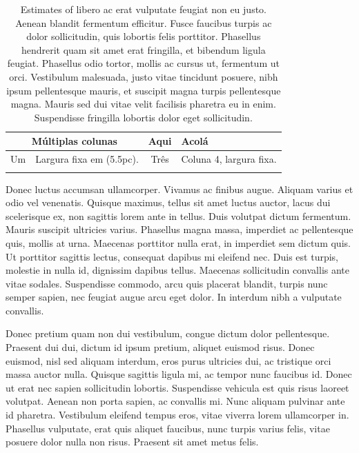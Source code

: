 \begin{btUnit}
\begin{table}
\centering
\caption{Estimates of libero ac erat vulputate feugiat non
  eu justo. Aenean blandit fermentum efficitur. Fusce faucibus turpis
  ac dolor sollicitudin, quis lobortis felis porttitor. Phasellus
  hendrerit quam sit amet erat fringilla, et bibendum ligula feugiat.
  Phasellus odio tortor, mollis ac cursus ut, fermentum ut orci.
  Vestibulum malesuada, justo vitae tincidunt posuere, nibh ipsum
  pellentesque mauris, et suscipit magna turpis pellentesque magna.
  Mauris sed dui vitae velit facilisis pharetra eu in enim.
  Suspendisse fringilla lobortis dolor eget sollicitudin.}
\begin{tabular}{ c p{5.5pc} c p{5.5pc} }
\hline
\multicolumn{2}{c}{Múltiplas colunas} & Aqui & Acolá \\
\hline
Um & \raggedright\arraybackslash Largura fixa em (5.5pc). & Três &
\raggedright\arraybackslash Coluna 4, largura fixa.\\
\hline
\label{Tab:estim2}
\end{tabular}
\end{table}

Donec luctus accumsan ullamcorper. Vivamus ac finibus augue. Aliquam
varius et odio vel venenatis. Quisque maximus, tellus sit amet luctus
auctor, lacus dui scelerisque ex, non sagittis lorem ante in tellus.
Duis volutpat dictum fermentum. Mauris suscipit ultricies varius.
Phasellus magna massa, imperdiet ac pellentesque quis, mollis at urna.
Maecenas porttitor nulla erat, in imperdiet sem dictum quis. Ut
porttitor sagittis lectus, consequat dapibus mi eleifend nec. Duis est
turpis, molestie in nulla id, dignissim dapibus tellus. Maecenas
sollicitudin convallis ante vitae sodales. Suspendisse commodo, arcu
quis placerat blandit, turpis nunc semper sapien, nec feugiat augue
arcu eget dolor. In interdum nibh a vulputate convallis.

Donec pretium quam non dui vestibulum, congue dictum dolor
pellentesque. Praesent dui dui, dictum id ipsum pretium, aliquet
euismod risus. Donec euismod, nisl sed aliquam interdum, eros purus
ultricies dui, ac tristique orci massa auctor nulla. Quisque sagittis
ligula mi, ac tempor nunc faucibus id. Donec ut erat nec sapien
sollicitudin lobortis. Suspendisse vehicula est quis risus laoreet
volutpat. Aenean non porta sapien, ac convallis mi. Nunc aliquam
pulvinar ante id pharetra. Vestibulum eleifend tempus eros, vitae
viverra lorem ullamcorper in. Phasellus vulputate, erat quis aliquet
faucibus, nunc turpis varius felis, vitae posuere dolor nulla non
risus. Praesent sit amet metus felis.


\end{btUnit}
